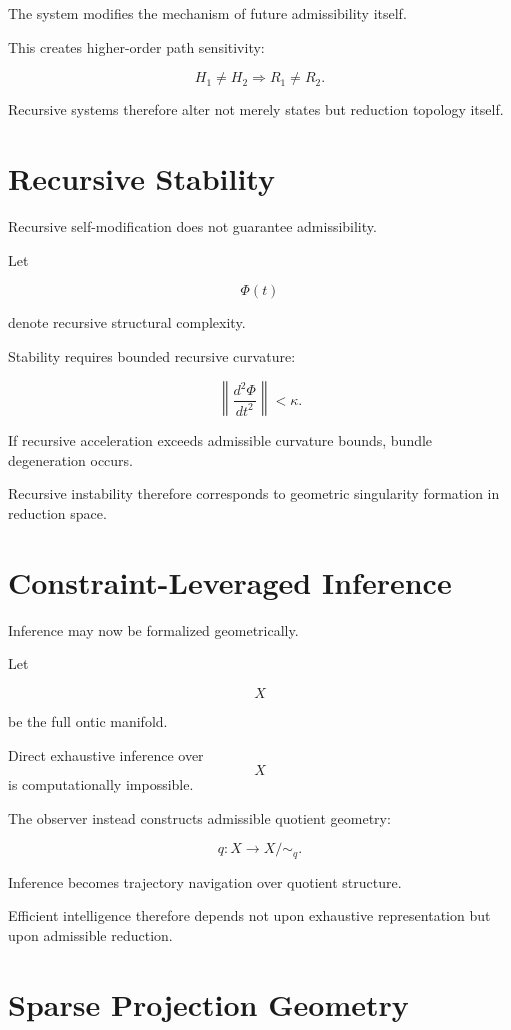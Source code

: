 \documentclass[12pt,openany]{book}
\theoremstyle{plain}
\theoremstyle{definition}
\theoremstyle{remark}
\begin{document}
The system modifies the mechanism of future admissibility itself.

This creates higher-order path sensitivity:

\[
H_1 \neq H_2
\Rightarrow
R_1 \neq R_2.
\]

Recursive systems therefore alter not merely states but reduction
topology itself.

\section{Recursive Stability}

Recursive self-modification does not guarantee admissibility.

Let

\[
\Phi(t)
\]

denote recursive structural complexity.

Stability requires bounded recursive curvature:

\[
\left\|
\frac{d^2\Phi}{dt^2}
\right\|
<
\kappa.
\]

If recursive acceleration exceeds admissible curvature bounds,
bundle degeneration occurs.

Recursive instability therefore corresponds to geometric
singularity formation in reduction space.

\section{Constraint-Leveraged Inference}

Inference may now be formalized geometrically.

Let

\[
X
\]

be the full ontic manifold.

Direct exhaustive inference over
\[
X
\]
is computationally impossible.

The observer instead constructs admissible quotient geometry:

\[
q :
X \to X/{\sim_q}.
\]

Inference becomes trajectory navigation over quotient structure.

Efficient intelligence therefore depends not upon exhaustive
representation but upon admissible reduction.

\section{Sparse Projection Geometry}
\end{document}
